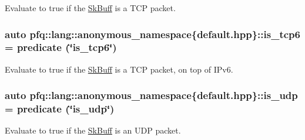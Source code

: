 Evaluate to {\ttfamily true} if the \hyperlink{structpfq_1_1lang_1_1SkBuff}{Sk\+Buff} is a T\+CP packet. 

\subsubsection[{\texorpdfstring{is\+\_\+tcp6}{is_tcp6}}]{\setlength{\rightskip}{0pt plus 5cm}auto pfq\+::lang\+::anonymous\+\_\+namespace\{default.\+hpp\}\+::is\+\_\+tcp6 = {\bf predicate} (\char`\"{}is\+\_\+tcp6\char`\"{})}\hypertarget{namespacepfq_1_1lang_1_1anonymous__namespace_02default_8hpp_03_a56d9bafc51ca6775da4ec3b816b1c7bb}{}\label{namespacepfq_1_1lang_1_1anonymous__namespace_02default_8hpp_03_a56d9bafc51ca6775da4ec3b816b1c7bb}


Evaluate to {\ttfamily true} if the \hyperlink{structpfq_1_1lang_1_1SkBuff}{Sk\+Buff} is a T\+CP packet, on top of I\+Pv6. 

\subsubsection[{\texorpdfstring{is\+\_\+udp}{is_udp}}]{\setlength{\rightskip}{0pt plus 5cm}auto pfq\+::lang\+::anonymous\+\_\+namespace\{default.\+hpp\}\+::is\+\_\+udp = {\bf predicate} (\char`\"{}is\+\_\+udp\char`\"{})}\hypertarget{namespacepfq_1_1lang_1_1anonymous__namespace_02default_8hpp_03_a42701f36d9dde7f3636b90244d520a16}{}\label{namespacepfq_1_1lang_1_1anonymous__namespace_02default_8hpp_03_a42701f36d9dde7f3636b90244d520a16}


Evaluate to {\ttfamily true} if the \hyperlink{structpfq_1_1lang_1_1SkBuff}{Sk\+Buff} is an U\+DP packet. 

